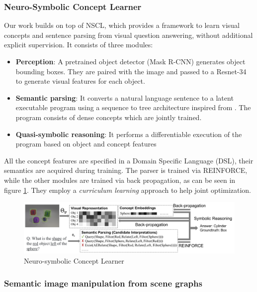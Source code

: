\subsubsection{Neuro-Symbolic Concept Learner \cite{Mao2019NeuroSymbolic}}
Our work builds on top of NSCL, which provides a framework to learn visual concepts and sentence parsing from visual question answering, without additional explicit supervision. It consists of three modules:
\begin{itemize}
    \item \textbf{Perception}: A pretrained object detector (Mask R-CNN) generates object bounding boxes. They are paired with the image and passed to a Resnet-34 to generate visual features for each object.
    \item \textbf{Semantic parsing}: It converts a natural language sentence to a latent executable program using a sequence to tree architecture inspired from \cite{dong2016language}. The program consists of dense concepts which are jointly trained.
    \item \textbf{Quasi-symbolic reasoning}: It performs a differentiable execution of the program based on object and concept features
\end{itemize}
All the concept features are specified in a Domain Specific Language (DSL), their semantics are acquired during training. The parser is trained via REINFORCE, while the other modules are trained via back propagation, as can be seen in figure \ref{fig:nscl}. They employ a \textit{curriculum learning} approach to help joint optimization.

\begin{figure}
    \centering
    \includegraphics[width=\textwidth]{assets/nscl.png}
    \caption{Neuro-symbolic Concept Learner}
    \label{fig:nscl}
\end{figure}

\subsubsection{Semantic image manipulation from scene graphs \cite{dhamo2020_SIMSG}}

